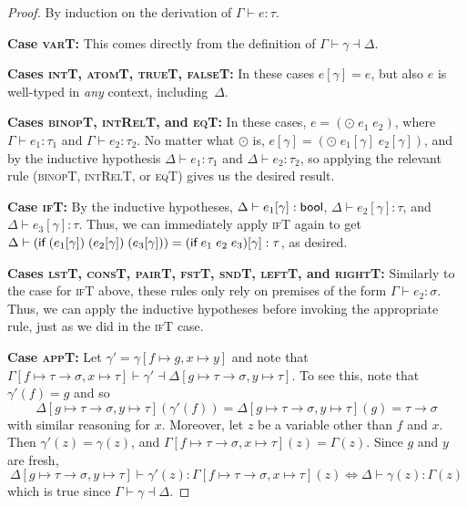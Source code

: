 \documentclass{homework}
\begin{document}
\begin{proof}
  By induction on the derivation of $\Gamma \vdash e : \tau$.

  \vspace{0.5em}\noindent\textbf{Case \textsc{varT}:}
  This comes directly from the definition of $\Gamma \vdash \gamma \dashv \Delta$.

  \vspace{0.5em}\noindent\textbf{Cases \textsc{intT}, \textsc{atomT}, \textsc{trueT}, \textsc{falseT}:}
  In these cases $e[\gamma] = e$, but also $e$ is well-typed in \emph{any} context, including~$\Delta$.
  
  \vspace{0.5em}\noindent\textbf{Cases \textsc{binopT}, \textsc{intRelT}, and \textsc{eqT}:}
  In these cases, $e = (\odot\; e_1\; e_2)$, where $\Gamma \vdash e_1 : \tau_1$ and $\Gamma \vdash e_2 : \tau_2$.
  No matter what $\odot$ is, $e[\gamma] = (\odot\; e_1[\gamma]\; e_2[\gamma])$, and by the inductive hypothesis $\Delta \vdash e_1 : \tau_1$ and $\Delta \vdash e_2 : \tau_2$, so applying the relevant rule (\textsc{binopT}, \textsc{intRelT}, or \textsc{eqT}) gives us the desired result.
  
  \vspace{0.5em}\noindent\textbf{Case \textsc{ifT}:}
  By the inductive hypotheses, $\Delta \vdash e_1[\gamma] : \textsf{bool}$, $\Delta \vdash e_2[\gamma] : \tau$, and $\Delta \vdash e_3[\gamma] : \tau$.
  Thus, we can immediately apply \textsc{ifT} again to get $\Delta \vdash (\textsf{if}\;(e_1[\gamma])\;(e_2[\gamma])\;(e_3[\gamma])) = (\textsf{if}\;e_1\;e_2\;e_3)[\gamma] : \tau$, as desired.
  
  \vspace{0.5em}\noindent\textbf{Cases \textsc{lstT}, \textsc{consT}, \textsc{pairT}, \textsc{fstT}, \textsc{sndT}, \textsc{leftT}, and \textsc{rightT}:}
  Similarly to the case for  \textsc{ifT} above, these rules only rely on premises of the form $\Gamma \vdash e_2 : \sigma$.
  Thus, we can apply the inductive hypotheses before invoking the appropriate rule, just as we did in the \textsc{ifT} case.

  \vspace{0.5em}\noindent\textbf{Case \textsc{appT}:}
  Let $\gamma' = \gamma[f \mapsto g, x \mapsto y]$ and note that $\Gamma[f \mapsto \tau \to \sigma, x  \mapsto \tau] \vdash \gamma' \dashv \Delta[g \mapsto \tau \to \sigma, y \mapsto \tau]$.
  To see this, note that $\gamma'(f) = g$ and so $$\Delta[g \mapsto \tau \to \sigma, y \mapsto \tau](\gamma'(f)) = \Delta[g \mapsto \tau \to \sigma, y \mapsto \tau](g) = \tau \to \sigma$$ with similar reasoning for $x$.
  Moreover, let $z$ be a variable other than $f$ and $x$.
  Then $\gamma'(z) = \gamma(z)$, and $\Gamma[f \mapsto \tau \to \sigma, x  \mapsto \tau](z) = \Gamma(z)$.
  Since $g$ and $y$ are fresh, $$\Delta[g \mapsto \tau \to \sigma, y \mapsto \tau] \vdash \gamma'(z) : \Gamma[f\mapsto \tau\to \sigma, x \mapsto \tau](z) \iff \Delta \vdash \gamma(z) : \Gamma(z)$$ which is true since $\Gamma \vdash \gamma \dashv \Delta$.


\end{proof}
\end{document}
